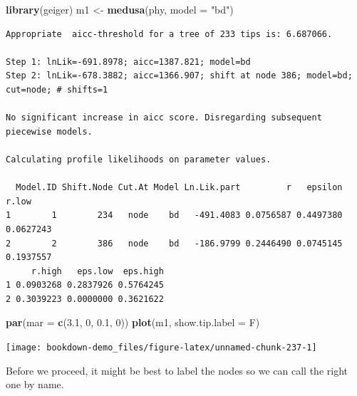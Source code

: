 \documentclass[
]{book}
\newenvironment{Shaded}{\begin{snugshade}}{\end{snugshade}}
\newcommand{\DataTypeTok}[1]{\textcolor[rgb]{0.13,0.29,0.53}{#1}}
\newcommand{\DecValTok}[1]{\textcolor[rgb]{0.00,0.00,0.81}{#1}}
\newcommand{\FloatTok}[1]{\textcolor[rgb]{0.00,0.00,0.81}{#1}}
\newcommand{\KeywordTok}[1]{\textcolor[rgb]{0.13,0.29,0.53}{\textbf{#1}}}
\newcommand{\NormalTok}[1]{#1}
\newcommand{\OperatorTok}[1]{\textcolor[rgb]{0.81,0.36,0.00}{\textbf{#1}}}
\newcommand{\StringTok}[1]{\textcolor[rgb]{0.31,0.60,0.02}{#1}}
\begin{document}
\begin{Shaded}
\begin{Highlighting}[]
\KeywordTok{library}\NormalTok{(geiger)}
\NormalTok{m1 \textless{}{-}}\StringTok{ }\KeywordTok{medusa}\NormalTok{(phy, }\DataTypeTok{model =} \StringTok{"bd"}\NormalTok{)}
\end{Highlighting}
\end{Shaded}

\begin{verbatim}
Appropriate  aicc-threshold for a tree of 233 tips is: 6.687066.

Step 1: lnLik=-691.8978; aicc=1387.821; model=bd
Step 2: lnLik=-678.3882; aicc=1366.907; shift at node 386; model=bd; cut=node; # shifts=1

No significant increase in aicc score. Disregarding subsequent piecewise models.

Calculating profile likelihoods on parameter values.

  Model.ID Shift.Node Cut.At Model Ln.Lik.part         r   epsilon     r.low
1        1        234   node    bd   -491.4083 0.0756587 0.4497380 0.0627243
2        2        386   node    bd   -186.9799 0.2446490 0.0745145 0.1937557
     r.high   eps.low  eps.high
1 0.0903268 0.2837926 0.5764245
2 0.3039223 0.0000000 0.3621622
\end{verbatim}

\begin{Shaded}
\begin{Highlighting}[]
\KeywordTok{par}\NormalTok{(}\DataTypeTok{mar =} \KeywordTok{c}\NormalTok{(}\FloatTok{3.1}\NormalTok{, }\DecValTok{0}\NormalTok{, }\FloatTok{0.1}\NormalTok{, }\DecValTok{0}\NormalTok{))}
\KeywordTok{plot}\NormalTok{(m1, }\DataTypeTok{show.tip.label =}\NormalTok{ F)}
\end{Highlighting}
\end{Shaded}

\begin{center}\texttt{[image: bookdown-demo\_files/figure-latex/unnamed-chunk-237-1]} \end{center}

Before we proceed, it might be best to label the nodes so we can call the right one by name.

\begin{Shaded}
\end{Shaded}
\end{document}
